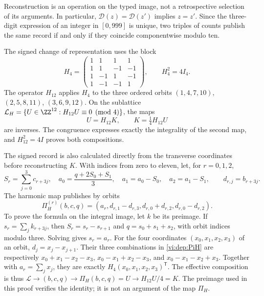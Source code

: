 Reconstruction is an operation on the typed image, not a
retrospective selection of its arguments. In particular,
\(\mathcal D(z)=\mathcal D(z')\) implies \(z=z'\).
Since the three-digit expression of an integer in \([0,999]\) is unique,
two triples of counts publish the same record if and only if they coincide
componentwise modulo ten.

The signed change of representation uses the block
\begin{equation}
 H_4=\begin{pmatrix}
 1&1&1&1\\1&1&-1&-1\\
 1&-1&1&-1\\1&-1&-1&1
 \end{pmatrix},\qquad H_4^2=4I_4.
 \label{vi:dep:hadamard}
\end{equation}
The operator \(H_{12}\) applies \(H_4\) to the three ordered orbits
\((1,4,7,10)\), \((2,5,8,11)\), \((3,6,9,12)\).
On the sublattice
\(\mathcal L_H=\{U\in\ZZ^{12}:H_{12}U\equiv0\pmod4\}\),
the maps
\begin{equation}
 U=H_{12}K,\qquad K=\tfrac14H_{12}U
 \label{vi:dep:K-reversible}
\end{equation}
are inverses. The congruence expresses exactly the integrality of the
second map, and \(H_{12}^2=4I\) proves both compositions.

The signed record is also calculated directly from the transverse
coordinates before reconstructing \(K\). With indices from zero to eleven,
let, for \(r=0,1,2\),
\[
 S_r=\sum_{j=0}^3c_{r+3j},\quad
 a_0=\frac{q+2S_0+S_1}{3},\quad
 a_1=a_0-S_0,\quad a_2=a_1-S_1,
 \qquad d_{r,j}=b_{r+3j}.
\]
The harmonic map publishes by orbits
\begin{equation}
 \Pi_H^{(r)}(b,c,q)=
 (a_r,d_{r,1}-d_{r,3},d_{r,0}+d_{r,2},d_{r,0}-d_{r,2}).
 \label{vi:dep:PiH}
\end{equation}
To prove the formula on the integral image, let \(k\) be its
preimage. If \(s_r=\sum_jk_{r+3j}\), then
\(S_r=s_r-s_{r+1}\) and \(q=s_0+s_1+s_2\), with orbit indices
modulo three. Solving gives \(s_r=a_r\). For the four coordinates
\((x_0,x_1,x_2,x_3)\) of an orbit,
\(d_j=x_j-x_{j+1}\). Their three combinations in
\eqref{vi:dep:PiH} are respectively
\(x_0+x_1-x_2-x_3\), \(x_0-x_1+x_2-x_3\), and
\(x_0-x_1-x_2+x_3\). Together with \(a_r=\sum_jx_j\), they are
exactly \(H_4(x_0,x_1,x_2,x_3)^{\mathsf T}\).
The effective composition is thus
\(\mathscr L\to(b,c,q)\to\Pi_H(b,c,q)=U\to H_{12}U/4=K\).
The preimage used in this proof verifies the identity;
it is not an argument of the map \(\Pi_H\).


